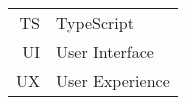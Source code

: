\begin{longtable}{rl}
TS & TypeScript\\
UI & User Interface\\
UX & User Experience\\
\end{longtable}